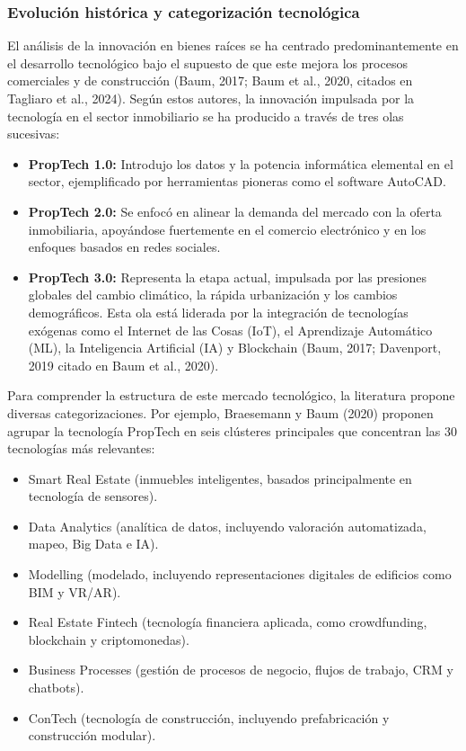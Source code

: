 \subsubsection{Evolución histórica y categorización tecnológica}

El análisis de la innovación en bienes raíces se ha centrado predominantemente en el desarrollo tecnológico bajo el supuesto de que este mejora los procesos comerciales y de construcción (Baum, 2017; Baum et al., 2020, citados en Tagliaro et al., 2024). Según estos autores, la innovación impulsada por la tecnología en el sector inmobiliario se ha producido a través de tres olas sucesivas:

\begin{itemize}
\item \textbf{PropTech 1.0:} Introdujo los datos y la potencia informática elemental en el sector, ejemplificado por herramientas pioneras como el software AutoCAD.
\item \textbf{PropTech 2.0:} Se enfocó en alinear la demanda del mercado con la oferta inmobiliaria, apoyándose fuertemente en el comercio electrónico y en los enfoques basados en redes sociales.
\item \textbf{PropTech 3.0:} Representa la etapa actual, impulsada por las presiones globales del cambio climático, la rápida urbanización y los cambios demográficos. Esta ola está liderada por la integración de tecnologías exógenas como el Internet de las Cosas (IoT), el Aprendizaje Automático (ML), la Inteligencia Artificial (IA) y Blockchain (Baum, 2017; Davenport, 2019 citado en Baum et al., 2020).
\end{itemize}

Para comprender la estructura de este mercado tecnológico, la literatura propone diversas categorizaciones. Por ejemplo, Braesemann y Baum (2020) proponen agrupar la tecnología PropTech en seis clústeres principales que concentran las 30 tecnologías más relevantes:

\begin{itemize}
\item Smart Real Estate (inmuebles inteligentes, basados principalmente en tecnología de sensores).
\item Data Analytics (analítica de datos, incluyendo valoración automatizada, mapeo, Big Data e IA).
\item Modelling (modelado, incluyendo representaciones digitales de edificios como BIM y VR/AR).
\item Real Estate Fintech (tecnología financiera aplicada, como crowdfunding, blockchain y criptomonedas).
\item Business Processes (gestión de procesos de negocio, flujos de trabajo, CRM y chatbots).
\item ConTech (tecnología de construcción, incluyendo prefabricación y construcción modular).
\end{itemize}

